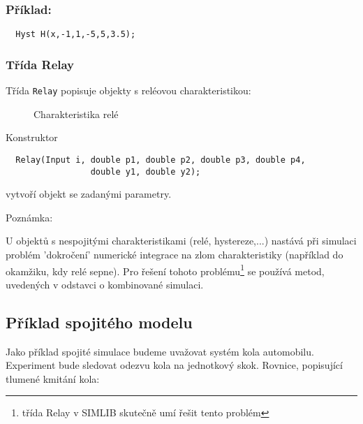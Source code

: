 \documentclass[a4paper]{article}
\begin{document}
\subsubsection*{Příklad:}

\begin{verbatim}
  Hyst H(x,-1,1,-5,5,3.5);
\end{verbatim}


\subsubsection*{Třída  Relay}

Třída \verb|Relay| popisuje objekty s reléovou charakteristikou:

\begin{figure}[ht]
  \begin{center}
    \caption{Charakteristika relé}
    \label{o7}
  \end{center}
\end{figure}


 Konstruktor

\begin{verbatim}
  Relay(Input i, double p1, double p2, double p3, double p4,
                 double y1, double y2);
\end{verbatim}

vytvoří objekt se zadanými parametry.

Poznámka:

U objektů s nespojitými charakteristikami (relé, hystereze,...) nastává při
simulaci problém 'dokročení' numerické integrace na zlom charakteristiky
(například do okamžiku, kdy relé sepne). Pro řešení tohoto problému\footnote{
třída Relay v SIMLIB skutečně umí řešit tento problém} se používá metod,
uvedených v odstavci o kombinované simulaci.


\subsection{Příklad spojitého modelu}

Jako příklad spojité simulace budeme uvažovat systém kola automobilu.
Experiment bude sledovat odezvu kola na jednotkový skok. Rovnice, popisující
tlumené kmitání kola:
\end{document}

